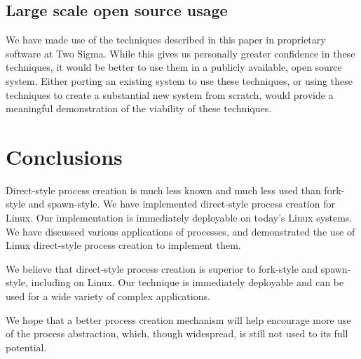 \documentclass[letterpaper,twocolumn,10pt]{article}
\begin{document}
\subsection{Large scale open source usage}
We have made use of the techniques described in this paper
in proprietary software at Two Sigma.
While this gives us personally greater confidence in these techniques,
it would be better to use them in a publicly available, open source system.
Either porting an existing system to use these techniques,
or using these techniques to create a substantial new system from scratch,
would provide a meaningful demonstration of the viability of these techniques.
\section{Conclusions}\label{conclusions}
Direct-style process creation is much less known and much less used than fork-style and spawn-style.
We have implemented direct-style process creation for Linux.
Our implementation is immediately deployable on today's Linux systems.
We have discussed various applications of processes,
and demonstrated the use of Linux direct-style process creation
to implement them.

We believe that direct-style process creation is superior to fork-style and spawn-style,
including on Linux.
Our technique is immediately deployable and can be used for a wide variety of complex applications.

We hope that a better process creation mechanism
will help encourage more use of the process abstraction,
which, though widespread,
is still not used to its full potential.



\end{document}
